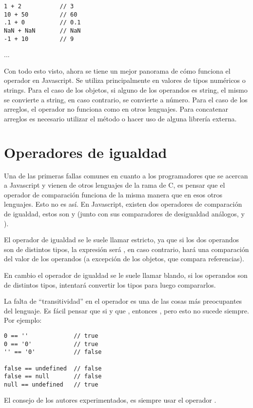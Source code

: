\begin{lstlisting}[title={Operador \code{+} en números}]
1 + 2 			// 3
10 + 50 		// 60
.1 + 0			// 0.1
NaN + NaN		// NaN
-1 + 10			// 9
\end{lstlisting}

...

Con todo esto visto, ahora se tiene un mejor panorama de cómo funciona el operador \code{+} en Javascript. Se utiliza principalmente en valores de tipos numéricos o strings. Para el caso de los objetos, si alguno de los operandos es string, el mismo se convierte a string, en caso contrario, se convierte a número. Para el caso de los arreglos, el operador \code{+} no funciona como en otros lenguajes. Para concatenar arreglos es necesario utilizar el método  o hacer uso de alguna librería externa.

\section{Operadores de igualdad}
\label{sec:eqeqeq}

Una de las primeras fallas comunes en cuanto a los programadores que se acercan a Javascript y vienen de otros lenguajes de la rama de C, es pensar que el operador de comparación \code{==} funciona de la misma manera que en esos otros lenguajes. Esto no es así. En Javascript, existen dos operadores de comparación de igualdad, estos son \code{==} y \code{===} (junto con sus comparadores de desigualdad análogos, \code{!=} y \code{!==}).

El operador de igualdad \code{===} se le suele llamar estricto, ya que si los dos operandos son de distintos tipos, la expresión será , en caso contrario, hará una comparación del valor de los operandos (a excepción de los objetos, que compara referencias).

En cambio el operador de igualdad \code{==} se le suele llamar blando, si los operandos son de distintos tipos, intentará convertir los tipos para luego compararlos.



La falta de "`transitividad"' en el operador \code{==} es una de las cosas más preocupantes del lenguaje. Es fácil pensar que si  y que , entonces , pero esto no sucede siempre.  Por ejemplo:

\begin{lstlisting}[title={Falta de transitividad en \code{==}}]
0 == ''             // true
0 == '0'            // true
'' == '0'           // false

false == undefined  // false
false == null       // false
null == undefined   // true
\end{lstlisting}

El consejo de los autores experimentados, es siempre usar el operador \code{===}.

